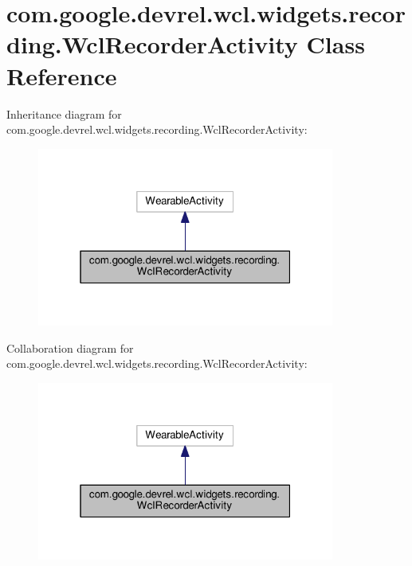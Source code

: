 \hypertarget{classcom_1_1google_1_1devrel_1_1wcl_1_1widgets_1_1recording_1_1WclRecorderActivity}{}\section{com.\+google.\+devrel.\+wcl.\+widgets.\+recording.\+Wcl\+Recorder\+Activity Class Reference}
\label{classcom_1_1google_1_1devrel_1_1wcl_1_1widgets_1_1recording_1_1WclRecorderActivity}


Inheritance diagram for com.\+google.\+devrel.\+wcl.\+widgets.\+recording.\+Wcl\+Recorder\+Activity\+:\nopagebreak
\begin{figure}[H]
\begin{center}
\leavevmode
\includegraphics[width=277pt]{df/dd7/classcom_1_1google_1_1devrel_1_1wcl_1_1widgets_1_1recording_1_1WclRecorderActivity__inherit__graph}
\end{center}
\end{figure}


Collaboration diagram for com.\+google.\+devrel.\+wcl.\+widgets.\+recording.\+Wcl\+Recorder\+Activity\+:\nopagebreak
\begin{figure}[H]
\begin{center}
\leavevmode
\includegraphics[width=277pt]{d5/dfc/classcom_1_1google_1_1devrel_1_1wcl_1_1widgets_1_1recording_1_1WclRecorderActivity__coll__graph}
\end{center}
\end{figure}

